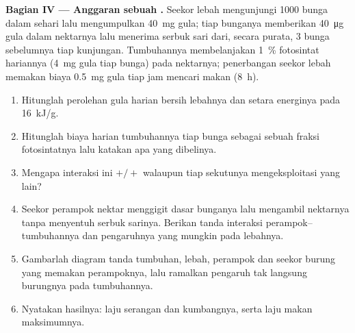 \begin{problem}
\medskip
\noindent\textbf{Bagian IV --- Anggaran sebuah .}
Seekor lebah mengunjungi 1000 bunga dalam sehari lalu mengumpulkan
\qty{40}{mg} gula; tiap bunganya memberikan \qty{40}{\micro g} gula
dalam nektarnya lalu menerima serbuk sari dari, secara purata, 3 bunga
sebelumnya tiap kunjungan. Tumbuhannya membelanjakan \qty{1}{\%}
fotosintat hariannya (\qty{4}{mg} gula tiap bunga) pada nektarnya;
penerbangan seekor lebah memakan biaya \qty{0.5}{mg} gula tiap jam
mencari makan (\qty{8}{h}).
\begin{enumerate}[resume]
  \item Hitunglah perolehan gula harian bersih lebahnya dan setara
        energinya pada \qty{16}{kJ/g}.
  \item Hitunglah biaya harian tumbuhannya tiap bunga sebagai sebuah
        fraksi fotosintatnya lalu katakan apa yang dibelinya.
  \item Mengapa interaksi ini $+/+$ walaupun tiap sekutunya
        mengeksploitasi yang lain?
  \item Seekor perampok nektar menggigit dasar bunganya lalu mengambil
        nektarnya tanpa menyentuh serbuk sarinya. Berikan tanda
        interaksi perampok--tumbuhannya dan pengaruhnya yang mungkin
        pada lebahnya.
  \item Gambarlah diagram tanda tumbuhan, lebah, perampok dan seekor
        burung yang memakan perampoknya, lalu ramalkan pengaruh tak
        langsung burungnya pada tumbuhannya.
  \item Nyatakan hasilnya: laju serangan dan 
        kumbangnya, serta laju makan maksimumnya.
\end{enumerate}
\end{problem}
